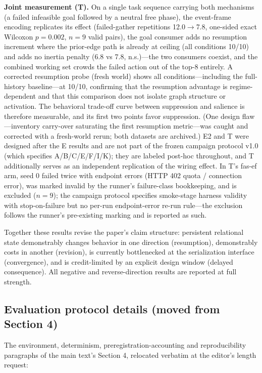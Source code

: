 \documentclass[10pt]{article}
\begin{document}
\textbf{Joint measurement (T).} On a single task sequence carrying
both mechanisms (a failed infeasible goal followed by a neutral free
phase), the event-frame encoding replicates its effect
(failed-gather repetitions 12.0$\rightarrow$7.8, one-sided exact
Wilcoxon $p{=}0.002$, $n{=}9$ valid pairs), the goal consumer adds no resumption increment where the
prior-edge path is already at ceiling (all conditions 10/10) and adds
no inertia penalty (6.8 vs 7.8, n.s.)---the two consumers coexist, and
the combined working set crowds the failed action out of the top-8
entirely. A corrected resumption probe (fresh world) shows all
conditions---including the full-history baseline---at 10/10, confirming
that the resumption advantage is regime-dependent and that this
comparison does not isolate graph structure or activation.
The behavioral trade-off curve between suppression and
salience is therefore measurable, and its first two points favor
suppression. (One design flaw---inventory carry-over saturating the first resumption metric---was caught and corrected with a fresh-world rerun; both datasets are archived.) E2 and T were designed after the E results and are not part of the frozen campaign protocol v1.0 (which specifies A/B/C/E/F/I/K); they are labeled post-hoc throughout, and T additionally serves as an independent replication of the wiring effect. In T's fas-ef arm, seed 0 failed twice with endpoint errors (HTTP 402 quota / connection error), was marked invalid by the runner's failure-class bookkeeping, and is excluded ($n{=}9$); the campaign protocol specifies smoke-stage harness validity with stop-on-failure but no per-run endpoint-error re-run rule---the exclusion follows the runner's pre-existing marking and is reported as such.

Together these results revise the paper's claim structure: persistent
relational state demonstrably changes behavior in one direction
(resumption), demonstrably costs in another (revision), is currently
bottlenecked at the serialization interface (convergence), and is
credit-limited by an explicit design window (delayed consequence).
All negative and reverse-direction results are reported at full
strength.




\subsection{Evaluation protocol details (moved from Section 4)}
The environment, determinism, preregistration-accounting and reproducibility paragraphs of the main text's Section 4, relocated verbatim at the editor's length request:
\end{document}
